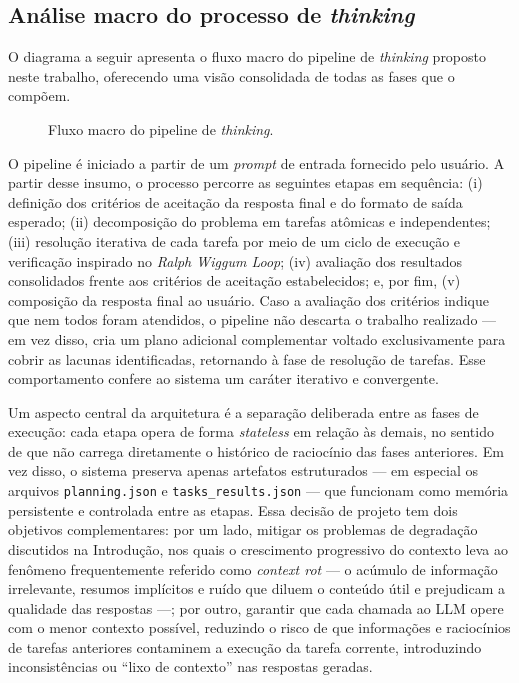 \documentclass[a4paper,10pt,twocolumn]{article}
\begin{document}
\subsection{Análise macro do processo de \textit{thinking}}

O diagrama a seguir apresenta o fluxo macro do pipeline de \textit{thinking} proposto neste trabalho, oferecendo uma visão consolidada de todas as fases que o compõem.

\begin{figure}[H]
  \centering
  
  \caption{Fluxo macro do pipeline de \textit{thinking}.}
  \label{fig:fluxo_macro}
\end{figure}

O pipeline é iniciado a partir de um \textit{prompt} de entrada fornecido pelo usuário. A partir desse insumo, o processo percorre as seguintes etapas em sequência: (i) definição dos critérios de aceitação da resposta final e do formato de saída esperado; (ii) decomposição do problema em tarefas atômicas e independentes; (iii) resolução iterativa de cada tarefa por meio de um ciclo de execução e verificação inspirado no \textit{Ralph Wiggum Loop}; (iv) avaliação dos resultados consolidados frente aos critérios de aceitação estabelecidos; e, por fim, (v) composição da resposta final ao usuário. Caso a avaliação dos critérios indique que nem todos foram atendidos, o pipeline não descarta o trabalho realizado — em vez disso, cria um plano adicional complementar voltado exclusivamente para cobrir as lacunas identificadas, retornando à fase de resolução de tarefas. Esse comportamento confere ao sistema um caráter iterativo e convergente.

Um aspecto central da arquitetura é a separação deliberada entre as fases de execução: cada etapa opera de forma \textit{stateless} em relação às demais, no sentido de que não carrega diretamente o histórico de raciocínio das fases anteriores. Em vez disso, o sistema preserva apenas artefatos estruturados — em especial os arquivos \texttt{planning.json} e \texttt{tasks\_results.json} — que funcionam como memória persistente e controlada entre as etapas. Essa decisão de projeto tem dois objetivos complementares: por um lado, mitigar os problemas de degradação discutidos na Introdução, nos quais o crescimento progressivo do contexto leva ao fenômeno frequentemente referido como \textit{context rot} — o acúmulo de informação irrelevante, resumos implícitos e ruído que diluem o conteúdo útil e prejudicam a qualidade das respostas —; por outro, garantir que cada chamada ao LLM opere com o menor contexto possível, reduzindo o risco de que informações e raciocínios de tarefas anteriores contaminem a execução da tarefa corrente, introduzindo inconsistências ou ``lixo de contexto'' nas respostas geradas.
\end{document}
